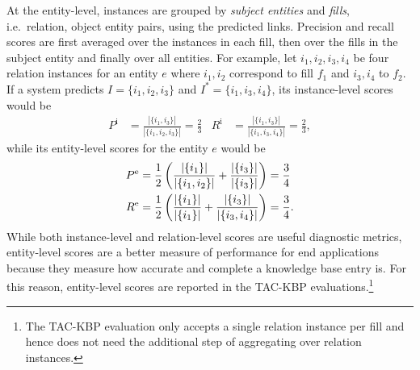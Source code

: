 At the entity-level, instances are grouped by \textit{subject entities} and \textit{fills}, i.e.\ relation, object entity pairs, using the predicted links. Precision and recall scores are first averaged over the instances in each fill, then over the fills in the subject entity and finally over all entities. For example, let $i_1, i_2, i_3, i_4$ be four relation instances for an entity $e$ where $i_1, i_2$ correspond to fill $f_1$ and $i_3, i_4$ to $f_2$. If a system predicts $I = \{i_1, i_2, i_3\}$ and $I^* = \{i_1, i_3, i_4\}$, its instance-level scores would be
\begin{align*}
  P^\text{i} &= \frac{|\{i_1, i_3\}|}{|\{i_1, i_2, i_3\}|} = \frac{2}{3} &
  R^\text{i} &= \frac{|\{i_1, i_3\}|}{|\{i_1, i_3, i_4\}|} = \frac{2}{3},
\end{align*}
while its entity-level scores for the entity $e$ would be
\begin{align*}
  P^\text{e} &= \frac{1}{2} \left(\frac{|\{i_1\}|}{|\{i_1, i_2\}|} + \frac{|\{i_3\}|}{|\{i_3\}|} \right) = \frac{3}{4} \\
  R^\text{e} &= \frac{1}{2} \left(\frac{|\{i_1\}|}{|\{i_1\}|} + \frac{|\{i_3\}|}{|\{i_3, i_4\}|} \right) = \frac{3}{4}.
\end{align*}
While both instance-level and relation-level scores are useful diagnostic metrics, entity-level scores are a better measure of performance for end applications because they measure how accurate and complete a knowledge base entry is.
For this reason, entity-level scores are reported in the TAC-KBP evaluations.\footnote{%
  The TAC-KBP evaluation only accepts a single relation instance per fill and hence does not need the additional step of aggregating over relation instances.
}

